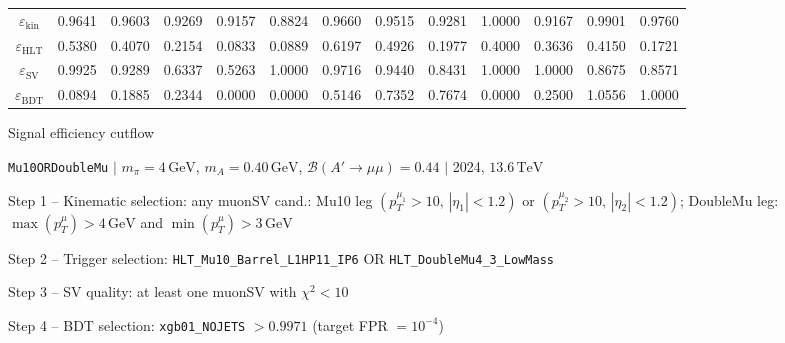 \documentclass[10pt,a4paper]{article}
\begin{document}
\begin{landscape}
{\begin{tabular}{c|cccc|cccc|cccc}
\midrule
$\varepsilon_{\mathrm{kin}}$ & 0.9641 & 0.9603 & 0.9269 & 0.9157 & 0.8824 & 0.9660 & 0.9515 & 0.9281 & 1.0000 & 0.9167 & 0.9901 & 0.9760\\
$\varepsilon_{\mathrm{HLT}}$ & 0.5380 & 0.4070 & 0.2154 & 0.0833 & 0.0889 & 0.6197 & 0.4926 & 0.1977 & 0.4000 & 0.3636 & 0.4150 & 0.1721\\
$\varepsilon_{\mathrm{SV}}$ & 0.9925 & 0.9289 & 0.6337 & 0.5263 & 1.0000 & 0.9716 & 0.9440 & 0.8431 & 1.0000 & 1.0000 & 0.8675 & 0.8571\\
$\varepsilon_{\mathrm{BDT}}$ & 0.0894 & 0.1885 & 0.2344 & 0.0000 & 0.0000 & 0.5146 & 0.7352 & 0.7674 & 0.0000 & 0.2500 & 1.0556 & 1.0000\\
\bottomrule
\end{tabular}}

\end{landscape}
\clearpage

{\large Signal efficiency cutflow

 \texttt{Mu10ORDoubleMu} $|$ $m_{\pi}=4\,\mathrm{GeV}$, $m_{A}=0.40\,\mathrm{GeV}$, $\mathcal{B}(A'\!\to\!\mu\mu)=0.44$ $|$ 2024, $13.6\,\mathrm{TeV}$}

\vspace{0.8em}

Step 1 -- Kinematic selection: any muonSV cand.: Mu10 leg $(p_T^{\mu_1}{>}10,\,|\eta_1|{<}1.2)$ or $(p_T^{\mu_2}{>}10,\,|\eta_2|{<}1.2)$; DoubleMu leg: $\max(p_T^{\mu}){>}4\,\mathrm{GeV}$ and $\min(p_T^{\mu}){>}3\,\mathrm{GeV}$

Step 2 -- Trigger selection: \texttt{HLT\_Mu10\_Barrel\_L1HP11\_IP6} OR \texttt{HLT\_DoubleMu4\_3\_LowMass}

Step 3 -- SV quality: at least one muonSV with $\chi^2<10$

Step 4 -- BDT selection: \texttt{xgb01\_NOJETS} $>0.9971$ (target FPR $=10^{-4}$)

\vspace{0.8em}
\end{document}
